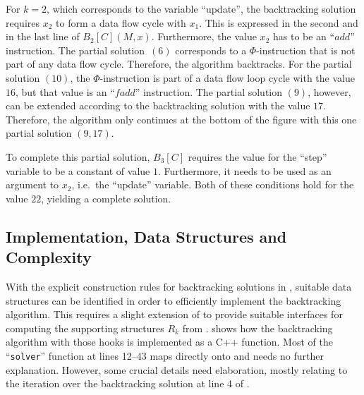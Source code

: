     For $k=2$, which corresponds to the variable ``update'', the backtracking
    solution requires $x_2$ to form a data flow cycle with $x_1$.
    This is expressed  in the second and in the last line of $B_2[C](M,x)$.
    Furthermore, the value $x_2$ has to be an ``$\textit{add}$'' instruction.
    The partial solution~$(6)$ corresponds to a $\Phi$-instruction that is not
    part of any data flow cycle.
    Therefore, the algorithm backtracks.
    For the partial solution $(10)$, the $\Phi$-instruction is part of a data
    flow loop cycle with the value $16$, but that value is an
    ``$\textit{fadd}$'' instruction.
    The partial solution $(9)$, however, can be extended according to the
    backtracking solution with the value $17$.
    Therefore, the algorithm only continues at the bottom of the figure with
    this one partial solution $(9,17)$.

    To complete this partial solution, $B_3[C]$ requires the value for the
    ``step'' variable to be a constant of value $1$.
    Furthermore, it needs to be used as an argument to $x_2$, i.e.\ the
    ``update'' variable.
    Both of these conditions hold for the value $22$, yielding a complete
    solution.

\subsection{Implementation, Data Structures and Complexity}
\label{subsec:impl}

\begin{figure}[p]
    
\end{figure}

    With the explicit construction rules for backtracking solutions in
    , suitable data structures
    can be identified in order to efficiently implement the
    backtracking algorithm.
    This requires a slight extension of  to provide suitable
    interfaces for computing the supporting structures $R_k$ from
    .
     shows how the backtracking algorithm with those hooks is
    implemented as a C++ function.
    Most of the ``\texttt{solver}'' function at lines 12--43 maps directly onto
     and needs no further explanation.
    However, some crucial details need elaboration, mostly relating to the
    iteration over the backtracking solution at line 4 of .

